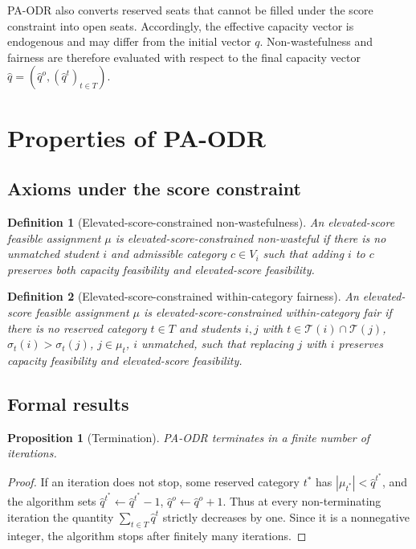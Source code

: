 \documentclass[10pt]{article}
\newtheorem{definition}{Definition}
\newtheorem{proposition}{Proposition}
\newcommand{\T}{\mathcal{T}}
\newcommand{\1}{\mathbf{1}}
\begin{document}
PA-ODR also converts reserved seats that cannot be filled under the score constraint into open seats. Accordingly, the effective capacity vector is endogenous and may differ from the initial vector $q$. Non-wastefulness and fairness are therefore evaluated with respect to the final capacity vector $\hat q=(\hat q^o,(\hat q^t)_{t\in T})$.

\section{Properties of PA-ODR}

\subsection{Axioms under the score constraint}

\begin{definition}[Elevated-score-constrained non-wastefulness]
An elevated-score feasible assignment $\mu$ is \emph{elevated-score-constrained non-wasteful} if there is no unmatched student $i$ and admissible category $c\in V_i$ such that adding $i$ to $c$ preserves both capacity feasibility and elevated-score feasibility.
\end{definition}

\begin{definition}[Elevated-score-constrained within-category fairness]
An elevated-score feasible assignment $\mu$ is \emph{elevated-score-constrained within-category fair} if there is no reserved category $t\in T$ and students $i,j$ with $t\in\T(i)\cap\T(j)$, $\sigma_t(i)>\sigma_t(j)$, $j\in\mu_t$, $i$ unmatched, such that replacing $j$ with $i$ preserves capacity feasibility and elevated-score feasibility.
\end{definition}

\subsection{Formal results}

\begin{proposition}[Termination]
\label{prop:pa-odr-termination}
PA-ODR terminates in a finite number of iterations.
\end{proposition}

\begin{proof}
If an iteration does not stop, some reserved category $t^\ast$ has $|\mu_{t^\ast}|<\hat q^{t^\ast}$, and the algorithm sets $\hat q^{t^\ast}\gets\hat q^{t^\ast}-1$, $\hat q^o\gets\hat q^o+1$. Thus at every non-terminating iteration the quantity $\sum_{t\in T}\hat q^t$ strictly decreases by one. Since it is a nonnegative integer, the algorithm stops after finitely many iterations.
\end{proof}
\end{document}

